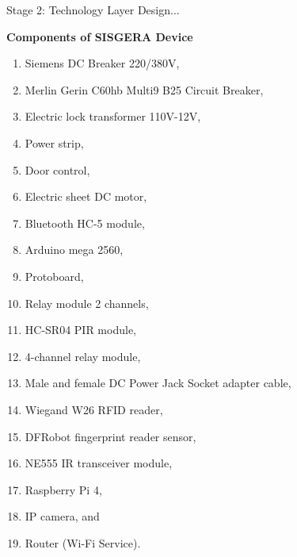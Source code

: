 \documentclass[notes=show, 10pt]{beamer}
\begin{document}
    \begin{frame}
        \begin{block}{Stage 2: Technology Layer Design...}
        
        \textbf{Components of SISGERA Device}            \begin{multicols}{2}
                \begin{enumerate}
                    \item Siemens DC Breaker 220/380V,
                    \item Merlin Gerin C60hb Multi9 B25 Circuit Breaker,
                    \item Electric lock transformer 110V-12V,
                    \item Power strip,
                    \item Door control,
                    \item Electric sheet DC motor,
                    \item Bluetooth HC-5 module,
                    \item Arduino mega 2560,
                    \item Protoboard,
                    \item Relay module 2 channels,
                    \item HC-SR04 PIR module,
                    \item 4-channel relay module,
                    \item Male and female DC Power Jack Socket adapter cable,
                    \item Wiegand W26 RFID reader,
                    \item DFRobot fingerprint reader sensor,
                    \item NE555 IR transceiver module,
                    \item Raspberry Pi 4,
                    \item IP camera, and
                    \item Router (Wi-Fi Service).
                \end{enumerate}
            \end{multicols}
        \end{block}
    \end{frame}
    
\end{document}
